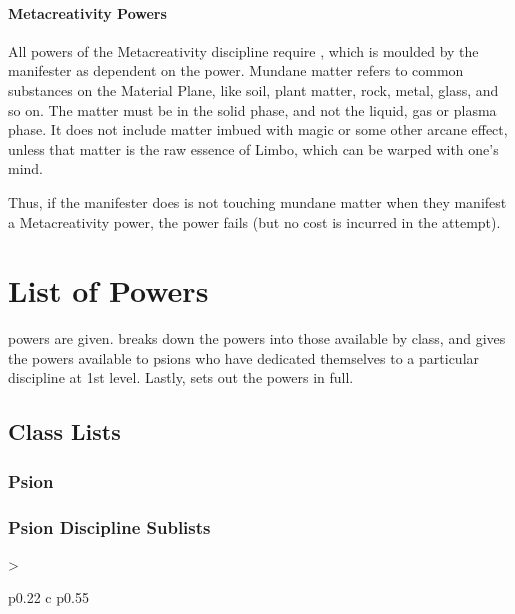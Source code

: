 \subsubsection{Metacreativity Powers}
All powers of the Metacreativity discipline require
, which is moulded by the manifester
as dependent on the power.
Mundane matter refers to common substances on the
Material Plane,
like soil, plant matter, rock, metal,
glass, and so on.
The matter must be in the solid phase,
and not the liquid, gas or plasma phase.
It does not include matter imbued with magic
or some other arcane effect,
unless that matter is the raw essence of Limbo,
which can be warped with one's mind.

Thus,
if the manifester does is not touching mundane matter
when they manifest a Metacreativity power,
the power fails (but no cost is incurred in the attempt).

\chapter{List of Powers}
\label{chap:list_of_powers}
powers are given.
 breaks down the powers into those
available by class,
and  gives the powers
available to psions who have dedicated themselves to a
particular discipline at 1st level.
Lastly,
 sets out the powers in full.

\section{Class Lists}
\label{sec:class_lists}
\DndSetThemeColor[DmgLavender]
\subsection{Psion}
\begin{dndlongtable}[
    >{\raggedright\arraybackslash}p{0.22\linewidth} c p{0.55\linewidth}]
    
\end{dndlongtable}

\subsection{Psion Discipline Sublists}
\label{sub:discipline_sublists}
\DndSetThemeColor[PhbLightCyan]
\begin{DndTable}[header=Prescience Sublist, bold=false]{
    >{\raggedright\arraybackslash}p{0.22\linewidth} c p{0.55\linewidth}}
    
\end{DndTable}


